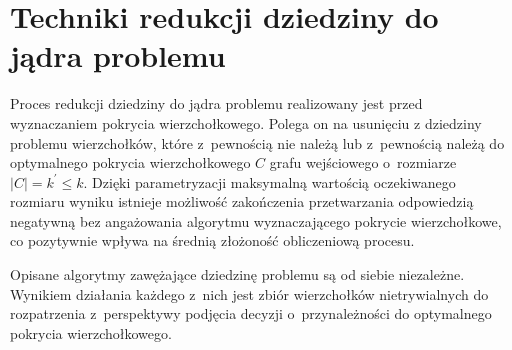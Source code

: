\section{Techniki redukcji dziedziny do jądra problemu}\label{s_kernelization}

Proces redukcji dziedziny do jądra problemu realizowany jest przed wyznaczaniem pokrycia wierzchołkowego. 
Polega on na usunięciu z dziedziny problemu wierzchołków, które z~pewnością nie należą lub z~pewnością należą do optymalnego pokrycia wierzchołkowego $C$ grafu wejściowego o~rozmiarze $|C| = k^\prime \leq k$.
Dzięki parametryzacji maksymalną wartością oczekiwanego rozmiaru wyniku istnieje możliwość zakończenia przetwarzania odpowiedzią negatywną bez
angażowania algorytmu wyznaczającego pokrycie wierzchołkowe, co pozytywnie
wpływa na średnią złożoność obliczeniową procesu.

Opisane algorytmy zawężające dziedzinę problemu są od siebie niezależne.
Wynikiem działania każdego z~nich jest zbiór wierzchołków nietrywialnych do
rozpatrzenia z~perspektywy podjęcia decyzji o~przynależności do optymalnego
pokrycia wierzchołkowego.






